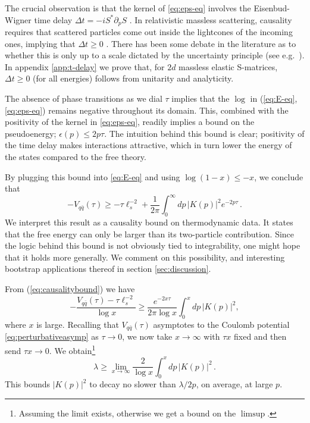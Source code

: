\documentclass[
 reprint,
 amsmath,
 pre,
 amssymb,
 nofootinbib,
 aps,
 longbibliography,
]{revtex4-1}
\newcommand{\<}{{\langle}}
\renewcommand{\>}{{\rangle}}
\begin{document}
The crucial observation is that the kernel of \eqref{eq:eps-eq} involves the Eisenbud-Wigner time delay $\Delta t = -i S^* \partial_p S$ \cite{eisenbud1948formal,Wigner:1955zz}. In relativistic massless scattering, causality requires that scattered particles come out inside the lightcones of the incoming ones, implying that $\Delta t\geq 0$ \cite{Adams:2006sv,Camanho:2014apa}. There has been some debate in the literature as to whether this is only up to a scale dictated by the uncertainty principle (see e.g.\ \cite{Chen:2023rar}). In appendix \ref{app:t-delay} we prove that, for $2d$ massless elastic S-matrices, $\Delta t\geq 0$ (for all energies) follows from unitarity and analyticity.

The absence of phase transitions as we dial $\tau$ implies that the $\log$ in (\ref{eq:E-eq},\ref{eq:eps-eq}) remains negative throughout its domain. This, combined with the positivity of the kernel in \eqref{eq:eps-eq}, readily implies a bound on the pseudoenergy; $\epsilon(p) \leq 2p \tau$. The intuition behind this bound is clear; positivity of the time delay makes interactions attractive, which in turn lower the energy of the states compared to the free theory.

By plugging this bound into \eqref{eq:E-eq} and using $\log(1-x)\leq-x$, we conclude that
\begin{equation}
    -V_{q\bar q}(\tau) \geq {-\tau \ell_s^{-2}+}\frac{1}{2\pi} \int_0^\infty dp \, |K(p)|^2 e^{-2p\tau}\,. \label{eq:causalitybound}
\end{equation}
We interpret this result as a causality bound on thermodynamic data. It states that the free energy can only be larger than its two-particle contribution. Since the logic behind this bound is not obviously tied to integrability, one might hope that it holds more generally. We comment on this possibility, and interesting bootstrap applications thereof in section \ref{sec:discussion}.

From (\ref{eq:causalitybound}) we have
\begin{equation}
     -\frac{V_{q\bar q}(\tau) - \tau \ell_s^{-2}}{\log x}\geq \frac{e^{- 2 x \tau}}{2\pi \log x} \int_0^x dp \, |K(p)|^2,\nonumber
\end{equation}
where $x$ is large. Recalling that $V_{q\bar q}(\tau)$ asymptotes to the Coulomb potential \eqref{eq:perturbativeasymp} as $\tau\to 0$, we now take $x\rightarrow \infty$ with $\tau x $ fixed and then send $\tau x \rightarrow 0$. We obtain\footnote{Assuming the limit exists, otherwise we get a bound on the $\limsup$.}
\begin{equation}\label{eq:decayK}
    \lambda \geq \lim_{x\rightarrow\infty} \frac{2}{\log x}\int_0^x dp\, |K(p)|^2\,.
\end{equation}
This bounds $|K(p)|^2$ to decay no slower than $\lambda/2p$, on average, at large $p$.
\end{document}
